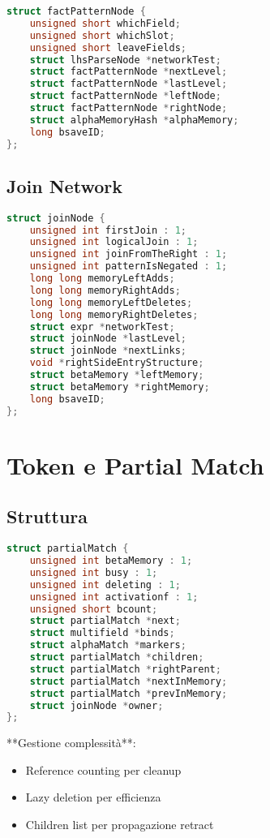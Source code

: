 \begin{lstlisting}[language=C]
struct factPatternNode {
    unsigned short whichField;
    unsigned short whichSlot;
    unsigned short leaveFields;
    struct lhsParseNode *networkTest;
    struct factPatternNode *nextLevel;
    struct factPatternNode *lastLevel;
    struct factPatternNode *leftNode;
    struct factPatternNode *rightNode;
    struct alphaMemoryHash *alphaMemory;
    long bsaveID;
};
\end{lstlisting}

\subsection{Join Network}

\begin{lstlisting}[language=C]
struct joinNode {
    unsigned int firstJoin : 1;
    unsigned int logicalJoin : 1;
    unsigned int joinFromTheRight : 1;
    unsigned int patternIsNegated : 1;
    long long memoryLeftAdds;
    long long memoryRightAdds;
    long long memoryLeftDeletes;
    long long memoryRightDeletes;
    struct expr *networkTest;
    struct joinNode *lastLevel;
    struct joinNode *nextLinks;
    void *rightSideEntryStructure;
    struct betaMemory *leftMemory;
    struct betaMemory *rightMemory;
    long bsaveID;
};
\end{lstlisting}

\section{Token e Partial Match}

\subsection{Struttura}

\begin{lstlisting}[language=C]
struct partialMatch {
    unsigned int betaMemory : 1;
    unsigned int busy : 1;
    unsigned int deleting : 1;
    unsigned int activationf : 1;
    unsigned short bcount;
    struct partialMatch *next;
    struct multifield *binds;
    struct alphaMatch *markers;
    struct partialMatch *children;
    struct partialMatch *rightParent;
    struct partialMatch *nextInMemory;
    struct partialMatch *prevInMemory;
    struct joinNode *owner;
};
\end{lstlisting}

**Gestione complessità**:
\begin{itemize}
\item Reference counting per cleanup
\item Lazy deletion per efficienza
\item Children list per propagazione retract
\end{itemize}

